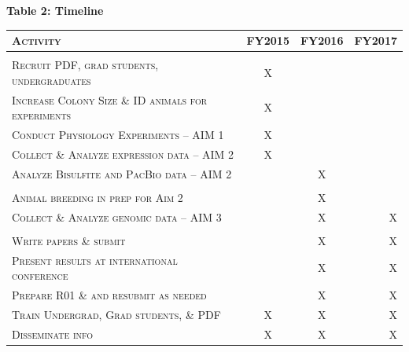 \documentclass[11pt]{article}
\begin{document}
\vspace{3mm}
\textbf{Table 2: Timeline}
\hypertarget{Table 2}{}
\begin{center}
\begin{tabular}{l|c c r}

\textsc{Activity} & \textsc{FY2015} & \textsc{FY2016} & \textsc{FY2017} \\
\hline \\
\textsc{Recruit PDF, grad students, undergraduates} & X & & \\
\textsc{Increase Colony Size \& ID animals for experiments } & X & & \\
\textsc{Conduct Physiology Experiments -- AIM 1} & X & & \\
\textsc{Collect \& Analyze expression data -- AIM 2} & X & & \\
\textsc{Analyze Bisulfite and PacBio data -- AIM 2} & & X & \\
\textsc{} & &  &   \\
\textsc{Animal breeding in prep for Aim 2} & & X &  \\
\textsc{Collect \& Analyze genomic data -- AIM 3} & & X & X \\
\textsc{} & &  &   \\
\textsc{Write papers \& submit} & & X & X \\
\textsc{Present results at international conference} & & X & X \\
\textsc{Prepare R01 \& and resubmit as needed} & & X & X \\
\textsc{Train Undergrad, Grad students, \& PDF} & X & X & X \\
\textsc{Disseminate info} & X & X & X \\

\end{tabular}
\end{center}
\vspace{5mm}



\newpage
\setcounter{page}{1}
\singlespacing



\end{document}
